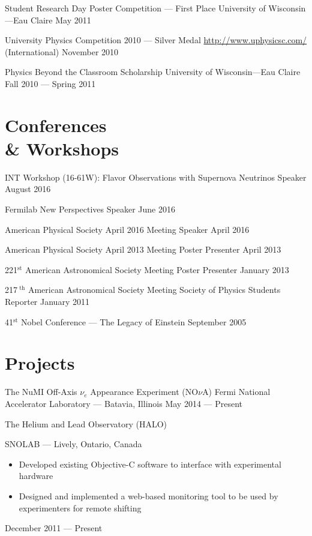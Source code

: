 \documentclass{cv}
\begin{document}
\begin{resume}
\object
{Student Research Day Poster Competition --- First Place}
{University of Wisconsin---Eau Claire}
{May 2011}


\object
{University Physics Competition 2010 --- Silver Medal}
{\href{http://www.uphysicsc.com/}{http://www.uphysicsc.com/} (International)}
{November 2010}


\object
{Physics Beyond the Classroom Scholarship}
{University of Wisconsin---Eau Claire}
{Fall 2010 --- Spring 2011}



\section{Conferences \\ \& Workshops}

\objectLarge
{INT Workshop (16-61W): Flavor Observations with}
{Supernova Neutrinos}
{Speaker}
{August 2016}

\object
{Fermilab New Perspectives}
{Speaker}
{June 2016}

\object
{American Physical Society April 2016 Meeting}
{Speaker}
{April 2016}


\object
{American Physical Society April 2013 Meeting}
{Poster Presenter}
{April 2013}


\object
{221$^\text{st}$ American Astronomical Society Meeting}
{Poster Presenter}
{January 2013}


\object
{217$^\text{ th}$ American Astronomical Society Meeting}
{Society of Physics Students Reporter}
{January 2011}


\object
{41$^\text{st}$ Nobel Conference --- The Legacy of Einstein}
{}
{September 2005}




\section{Projects}

\object
{The NuMI Off-Axis $\nu_e$ Appearance Experiment (NO$\nu$A)}
{Fermi National Accelerator Laboratory --- Batavia, Illinois \noemph}
{May 2014 --- Present}

\object
{The Helium and Lead Observatory (HALO)}
{SNOLAB --- Lively, Ontario, Canada \noemph
	\begin{itemize}
		\item Developed existing Objective-C software to interface with experimental hardware
		\item Designed and implemented a web-based monitoring tool to be used by experimenters for remote shifting
	\end{itemize}
 }
{December 2011 --- Present}



\end{resume}
\end{document}
